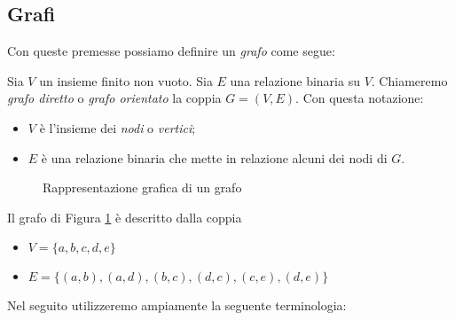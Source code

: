 \subsection{Grafi}
Con queste premesse possiamo definire un \emph{grafo} come segue:
\begin{definition}
    Sia $V$ un insieme finito non vuoto. Sia $E$ una relazione binaria su $V$. Chiameremo \emph{grafo diretto} o \emph{grafo orientato} la coppia $G = (V, E)$. Con questa notazione:
    \begin{itemize}
        \item $V$ è l'insieme dei \emph{nodi} o \emph{vertici};
        \item $E$ è una relazione binaria che mette in relazione alcuni dei nodi di $G$.
    \end{itemize}
\end{definition}
\begin{example}
    \begin{figure}[t]
        \centering
        \caption{Rappresentazione grafica di un grafo}
        \label{fig:graph}
    \end{figure}
    Il grafo di Figura \ref{fig:graph} è descritto dalla coppia
    \begin{itemize}
        \item $V = \{a,b,c,d,e\}$
        \item $E = \{(a,b), (a,d), (b,c), (d,c), (c,e), (d,e)\}$
    \end{itemize}
\end{example}
Nel seguito utilizzeremo ampiamente la seguente terminologia:
